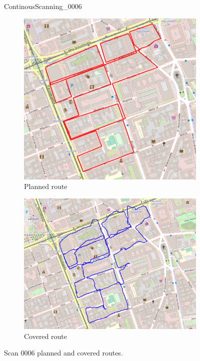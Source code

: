 \documentclass[a4paper,12pt]{book}
\begin{document}
\begin{enumerate}
\begin{figure}[H]
	\caption{ContinousScanning\_0006}
\end{figure}
\begin{figure}[H]
	\centering
	\begin{subfigure}{.80\textwidth}
		\centering
		\includegraphics[width=1\linewidth]{route_p6}
		\caption{Planned route}
		\label{fig:a6}
	\end{subfigure}%
	\linebreak
	\begin{subfigure}{.80\textwidth}
		\centering
		\includegraphics[width=1\linewidth]{route_c6}
		\caption{Covered route}
		\label{fig:b6}
	\end{subfigure}
	\caption{Scan 0006 planned and covered routes.}
	\label{fig:fig6}
\end{figure} 
\end{enumerate}
\end{document}
